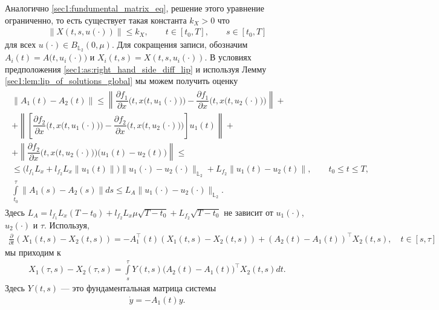 \documentclass[../main.tex]{subfiles}
\begin{document}
Аналогично \eqref{sec1:fundumental_matrix_eq}, решение этого уравнение ограниченно, то есть существует такая константа $k_X>0$ что
\begin{gather*}
    \| X(t,s, u(\cdot)) \| \leqslant k_X, \qquad t \in [t_0,T], \qquad s \in [t_0,T]
\end{gather*}
для всех $u(\cdot) \in B_{\mathbb{L}_2}(0,\mu)$. 
Для сокращения записи, обозначим $A_i(t) = A\big(t, u_i(\cdot)\big) $ и $ X_i(t,s) = X(t, s, u_i(\cdot))$. 
В условиях предположения \ref{sec1:as:right_hand_side_diff_lip} и используя Лемму \ref{sec1:lem:lip_of_solutions_global} мы можем получить оценку
\begin{gather}\label{sec1:lip_a}
\begin{gathered}
    \| A_1(t) - A_2(t) \| \leqslant 
    \left\| \dfrac{\partial f_1}{\partial x} \Big(t,x\big(t,u_1(\cdot)\big)\Big) - \dfrac{\partial f_1}{\partial x} \Big(t,x\big(t,u_2(\cdot)\big)\Big) \right\| + \\ +
    \left\| \left[ \dfrac{\partial f_2}{\partial x}\Big(t,x\big(t,u_1(\cdot)\big)\Big)  - \dfrac{\partial f_2}{\partial x}\Big(t,x\big(t,u_2(\cdot)\big)\Big) \right] u_1(t) \right\| + \\ +
    \left\| \dfrac{\partial f_2}{\partial x}\Big(t,x\big(t,u_2(\cdot)\big)\Big) \Big(u_1(t) - u_2(t)\Big) \right\| \leqslant \\ \leqslant
    \Big(l_{f_1} L_x  + l_{f_2} L_x \|u_1(t) \|\Big) \| u_1(\cdot) - u_2(\cdot) \|_{\mathbb{L}_2} +  L_{f_2} \| u_1(t) - u_2(t) \|, \qquad t_0 \leqslant t \leqslant T,\\
    \int\limits_{t_0}^{\tau} \|A_1(s) - A_2(s) \| ds \leqslant L_A \| u_1(\cdot) - u_2(\cdot) \|_{\mathbb{L}_2}. 
\end{gathered}
\end{gather}
Здесь $L_A = l_{f_1} L_x (T - t_0) + l_{f_2} L_x \mu \sqrt{T - t_0} + L_{f_2} \sqrt{T - t_0}$ не зависит от $u_1(\cdot)$, $u_2(\cdot)$ и $\tau$.
Используя,
\begin{gather*}
    \frac{\partial}{\partial t} \left(X_1(t,s) - X_2(t,s) \right) = -A_1^{\top}(t) \left(X_1(t,s) - X_2(t,s) \right) + (A_2(t) - A_1(t))^{\top} X_2(t,s), \quad t \in [s,\tau]
\end{gather*}
мы приходим к
\begin{gather*}
    X_1(\tau,s) - X_2(\tau,s) = \int\limits_s^{\tau} Y(t,s) \big(A_2(t) - A_1(t)\big)^{\top} X_2(t,s) dt.
\end{gather*}
Здесь $Y(t,s)$ --- это фундаментальная матрица системы 
\begin{gather*}
    \dot{y} = -A_1(t) y.
\end{gather*}
\end{document}
